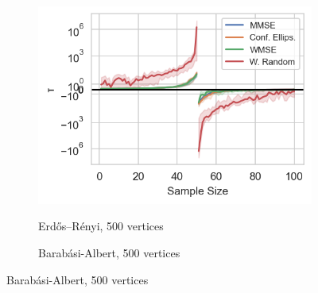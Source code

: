 \iffalse
\begin{figure}
    \centering
    \begin{subfigure}{0.3\columnwidth}
    \resizebox{\width}{0.62\columnwidth}
    {\includegraphics[width=\columnwidth]{figures/proj1/plots/LS_threshold/ER_0pt8_500_bandwidth_50_thresholds_LS.png}}
    \caption{Erdős–Rényi, 500 vertices} 
    \label{snr_ER}
    \end{subfigure}
    \hfill
    \begin{subfigure}{0.3\columnwidth}
    \caption{Barabási-Albert, 500 vertices}%

\end{subfigure}
\end{figure}

